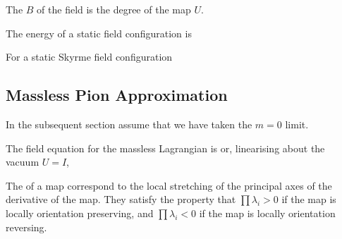 \documentclass{article}
\begin{document}
\begin{definition}
The  $B$ of the field is the degree of the map $U$. 
\end{definition}

\begin{prop}
The energy of a static field configuration is 
\end{prop}

\begin{prop}
For a static Skyrme field configuration
\end{prop}

\subsection{Massless Pion Approximation}
In the subsequent section assume that we have taken the $m=0$ limit. 

\begin{prop}
The field equation for the massless Lagrangian is 
or, linearising about the vacuum $U = I$, 
\end{prop}

\begin{definition}
The  of a map correspond to the local stretching of the principal axes of the derivative of the map. They satisfy the property that $\prod \lambda_i > 0$ if the map is locally orientation preserving, and $\prod \lambda_i < 0$ if the map is locally orientation reversing. 
\end{definition}
\end{document}
